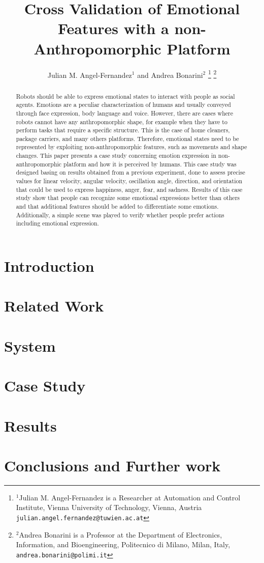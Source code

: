 \documentclass[letterpaper, 10 pt, conference]{ieeeconf}  %
\title{\LARGE \bf
Cross Validation of Emotional Features with a non-Anthropomorphic Platform
}
\author{Julian M. Angel-Fernandez$^{1}$ and Andrea Bonarini$^{2}$%
\thanks{$^{1}$Julian M. Angel-Fernandez is a Researcher at Automation and Control Institute, Vienna University of Technology, Vienna, Austria
        {\tt\small julian.angel.fernandez@tuwien.ac.at}}%
\thanks{$^{2}$Andrea Bonarini is a Professor at the Department of Electronics, Information, and Bioengineering, Politecnico di Milano, Milan, Italy,
        {\tt\small andrea.bonarini@polimi.it}}%
}
\begin{document}
\maketitle
\thispagestyle{empty}
\pagestyle{empty}


\begin{abstract}
Robots should be able to express emotional states to interact with people as social agents. Emotions are a peculiar characterization of humans and usually conveyed through face expression, body language and voice. However, there are cases where robots cannot have any anthropomorphic shape, for example when they have to perform tasks that require a specific structure. This is the case of home cleaners, package carriers, and many others platforms. Therefore, emotional states need to be represented by exploiting non-anthropomorphic features, such as movements and shape changes. This paper presents a case study concerning emotion expression in non-anthropomorphic platform and how it is perceived by humans. This case study was designed basing on results obtained from a previous experiment, done to assess precise values for linear velocity, angular velocity, oscillation angle, direction, and orientation that could be used to express happiness, anger, fear, and sadness. Results of this case study show that people can recognize some emotional expressions better than others and that additional features should be added to differentiate some emotions. Additionally, a simple scene was played to verify whether people prefer actions including emotional expression. 
\end{abstract}

\section{Introduction}

\section{Related Work}
\label{sec:related_work}

\section{System}
\label{sec:system}

\section{Case Study}
\label{sec:case}

\section{Results}
\label{sec:results}

\section{Conclusions and Further work}




\addtolength{\textheight}{-12cm}
\end{document}
